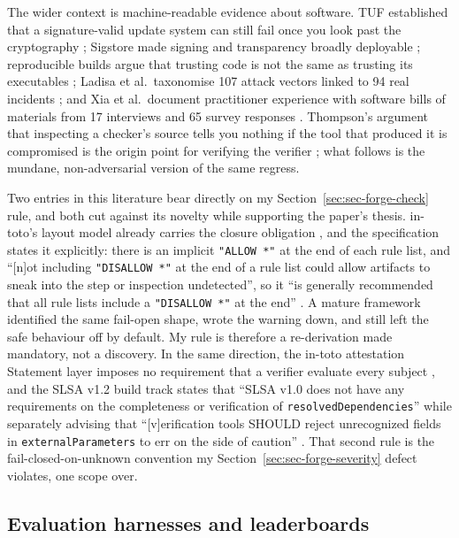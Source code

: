 \documentclass[11pt]{article}
\begin{document}
The wider context is machine-readable evidence about software. TUF established that a
signature-valid update system can still fail once you look past the cryptography
\citep{samuel2010tuf}; Sigstore made signing and transparency broadly deployable
\citep{newman2022sigstore}; reproducible builds argue that trusting code is not the same as
trusting its executables \citep{lamb2022reproducible,fourne2023flossing}; Ladisa et al.\
taxonomise 107 attack vectors linked to 94 real incidents \citep{ladisa2023sok}; and Xia et
al.\ document practitioner experience with software bills of materials from 17 interviews
and 65 survey responses \citep{xia2023sbom}. Thompson's argument that inspecting a
checker's source tells you nothing if the tool that produced it is compromised is the
origin point for verifying the verifier \citep{thompson1984trusting}; what follows is the
mundane, non-adversarial version of the same regress.

Two entries in this literature bear directly on my Section~\ref{sec:sec-forge-check} rule,
and both cut against its novelty while supporting the paper's thesis. in-toto's layout
model already carries the closure obligation \citep{torresarias2019intoto}, and the
specification states it explicitly: there is an implicit \texttt{"ALLOW *"} at the end of
each rule list, and ``[n]ot including \texttt{"DISALLOW *"} at the end of a rule list could
allow artifacts to sneak into the step or inspection undetected'', so it ``is generally
recommended that all rule lists include a \texttt{"DISALLOW *"} at the end''
\citep{intoto2023spec}. A mature framework identified the same fail-open shape, wrote the
warning down, and still left the safe behaviour off by default. My rule is therefore a
re-derivation made mandatory, not a discovery. In the same direction, the in-toto attestation
Statement layer imposes no requirement that a verifier evaluate every subject
\citep{intoto2024attestation}, and the SLSA v1.2 build track states that ``SLSA v1.0 does not
have any requirements on the completeness or verification of \texttt{resolvedDependencies}''
while separately advising that ``[v]erification tools SHOULD reject unrecognized fields in
\texttt{externalParameters} to err on the side of caution'' \citep{slsa2025spec}. That second
rule is the fail-closed-on-unknown convention my Section~\ref{sec:sec-forge-severity} defect
violates, one scope over.

\subsection{Evaluation harnesses and leaderboards}
\end{document}
